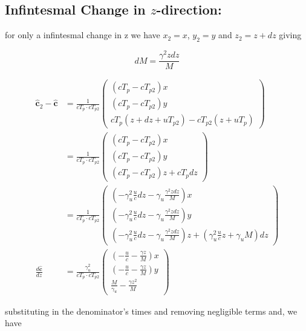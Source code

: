 \subsection{Infintesmal Change in $z$-direction:}

for only a infintesmal change in z we have $x_2=x$, $y_2=y$ and $z_2 = z + dz$ giving

\begin{equation}
	dM = \frac{\gamma^2 z d z}{M}
\end{equation}

\begin{equation}
	\begin{aligned}
	\mathbf{\hat{c}}_2 - \mathbf{\hat{c}} &= \frac{1}{c T_{p} \cdot c T_{p2}}
	\begin{pmatrix}
		(c T_{p} - c T_{p2}) x \\
		(c T_{p} - c T_{p2}) y \\
		c T_{p} (z + dz + u T_{p2}) - c T_{p2} (z + u T_{p})
	\end{pmatrix} \\
	&= \frac{1}{c T_{p} \cdot c T_{p2}}
	\begin{pmatrix}
		(c T_{p} - c T_{p2}) x \\
		(c T_{p} - c T_{p2}) y \\
		(c T_{p} - c T_{p2})  z + c T_{p} dz
	\end{pmatrix} \\
	&= \frac{1}{c T_{p} \cdot c T_{p2}}
	\begin{pmatrix}
		(- \gamma_u^2 \frac{u}{c} d z - \gamma_u \frac{\gamma^2 z d z}{M}) x \\
		(- \gamma_u^2 \frac{u}{c} d z - \gamma_u \frac{\gamma^2 z d z}{M}) y \\
		(- \gamma_u^2 \frac{u}{c} d z - \gamma_u \frac{\gamma^2 z d z}{M})  z + (\gamma_u^2 \frac{u}{c}z + \gamma_u M) dz
	\end{pmatrix} \\
	\frac{d\mathbf{\hat{c}}}{dz} &= \frac{\gamma_u^2}{c T_{p} \cdot c T_{p2}}
	\begin{pmatrix}
		(-  \frac{u}{c}  - \frac{\gamma z }{M}) x \\
		(-  \frac{u}{c}  - \frac{\gamma z }{M}) y \\
		\frac{M}{\gamma_u} -  \frac{\gamma z^2 }{M}
	\end{pmatrix}
	\end{aligned}
\end{equation}

substituting in the denominator's times and removing negligible terms and, we have

